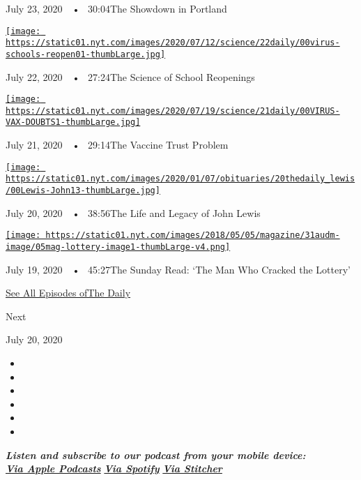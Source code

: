 July 23, 2020~~•~ 30:04The Showdown in Portland

\href{https://www.nytimes.com/2020/07/22/podcasts/the-daily/school-reopenings-coronavirus.html?action=click\&module=audio-series-bar\&region=header\&pgtype=Article}{\texttt{[image: https://static01.nyt.com/images/2020/07/12/science/22daily/00virus-schools-reopen01-thumbLarge.jpg]}}

July 22, 2020~~•~ 27:24The Science of School Reopenings

\href{https://www.nytimes.com/2020/07/21/podcasts/the-daily/coronavirus-vaccine.html?action=click\&module=audio-series-bar\&region=header\&pgtype=Article}{\texttt{[image: https://static01.nyt.com/images/2020/07/19/science/21daily/00VIRUS-VAX-DOUBTS1-thumbLarge.jpg]}}

July 21, 2020~~•~ 29:14The Vaccine Trust Problem

\href{https://www.nytimes.com/2020/07/20/podcasts/the-daily/john-lewis.html?action=click\&module=audio-series-bar\&region=header\&pgtype=Article}{\texttt{[image: https://static01.nyt.com/images/2020/01/07/obituaries/20thedaily\_lewis/00Lewis-John13-thumbLarge.jpg]}}

July 20, 2020~~•~ 38:56The Life and Legacy of John Lewis

\href{https://www.nytimes.com/2020/07/19/podcasts/the-daily/lottery-winner-scam.html?action=click\&module=audio-series-bar\&region=header\&pgtype=Article}{\texttt{[image: https://static01.nyt.com/images/2018/05/05/magazine/31audm-image/05mag-lottery-image1-thumbLarge-v4.png]}}

July 19, 2020~~•~ 45:27The Sunday Read: `The Man Who Cracked the
Lottery'

\href{https://www.nytimes.com/column/the-daily}{See All Episodes ofThe
Daily}

Next

July 20, 2020

\begin{itemize}
\item
\item
\item
\item
\item
\item
\end{itemize}

\emph{\textbf{Listen and subscribe to our podcast from your mobile
device:}}\\
\textbf{\href{https://itunes.apple.com/us/podcast/the-daily/id1200361736?mt=2}{\emph{Via
Apple Podcasts}}} \emph{\textbf{\textbar{}}}
\textbf{\href{https://open.spotify.com/show/3IM0lmZxpFAY7CwMuv9H4g?si=SfuMSC55R1qprFsRZU3_zw}{\emph{Via
Spotify}}} \emph{\textbf{\textbar{}}}
\textbf{\href{http://www.stitcher.com/podcast/the-new-york-times/the-daily-10}{\emph{Via
Stitcher}}}

